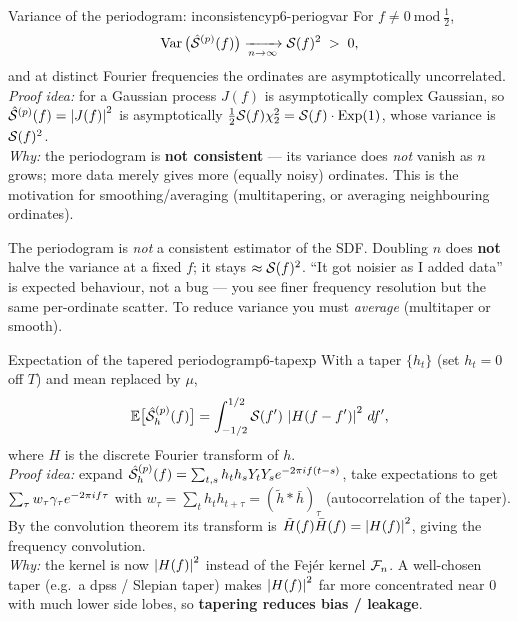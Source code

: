 \begin{theorem}{Variance of the periodogram: inconsistency}{p6-periogvar}
For $f\ne0\ \mathrm{mod}\ \tfrac12$,
\[
\operatorname{Var}\big(\hat{\mathcal{S}}^{(p)}(f)\big)\xrightarrow[n\to\infty]{}\mathcal{S}(f)^2 \;>\;0,
\]
and at distinct Fourier frequencies the ordinates are asymptotically
uncorrelated.\\[2pt]
\textit{Proof idea:} for a Gaussian process $J(f)$ is asymptotically complex
Gaussian, so $\hat{\mathcal{S}}^{(p)}(f)=\left\lvert J(f) \right\rvert^2$ is asymptotically
$\tfrac12\mathcal{S}(f)\chi^2_2=\mathcal{S}(f)\cdot\mathrm{Exp}(1)$, whose variance is
$\mathcal{S}(f)^2$.\\
\textit{Why:} the periodogram is \textbf{not consistent} --- its variance does
\emph{not} vanish as $n$ grows; more data merely gives more (equally noisy)
ordinates. This is the motivation for smoothing/averaging (multitapering,
or averaging neighbouring ordinates).
\end{theorem}

\begin{pitfall}
The periodogram is \emph{not} a consistent estimator of the SDF. Doubling $n$
does \textbf{not} halve the variance at a fixed $f$; it stays
$\approx\mathcal{S}(f)^2$. ``It got noisier as I added data'' is expected behaviour,
not a bug --- you see finer frequency resolution but the same per-ordinate
scatter. To reduce variance you must \emph{average} (multitaper or smooth).
\end{pitfall}

\begin{theorem}{Expectation of the tapered periodogram}{p6-tapexp}
With a taper $\{h_t\}$ (set $h_t=0$ off $T$) and mean replaced by $\mu$,
\[
\mathbb{E}\big[\hat{\mathcal{S}}^{(p)}_h(f)\big]
=\int_{-1/2}^{1/2}\mathcal{S}(f')\,\left\lvert H(f-f') \right\rvert^2\,df',
\]
where $H$ is the discrete Fourier transform of $h$.\\[2pt]
\textit{Proof idea:} expand $\hat{\mathcal{S}}^{(p)}_h(f)=\sum_{t,s}h_th_sY_tY_s
e^{-2\pi i f(t-s)}$, take expectations to get $\sum_\tau w_\tau\gamma_\tau
e^{-2\pi i f\tau}$ with $w_\tau=\sum_t h_th_{t+\tau}=(\tilde h*\bar h)_\tau$
(autocorrelation of the taper). By the convolution theorem its transform is
$\tilde H(f)\bar H(f)=\left\lvert H(f) \right\rvert^2$, giving the frequency convolution.\\
\textit{Why:} the kernel is now $\left\lvert H(f) \right\rvert^2$ instead of the Fej\'er kernel
$\mathcal{F}_n$. A well-chosen taper (e.g.\ a dpss / Slepian taper) makes
$\left\lvert H(f) \right\rvert^2$ far more concentrated near $0$ with much lower side lobes, so
\textbf{tapering reduces bias / leakage}.
\end{theorem}

